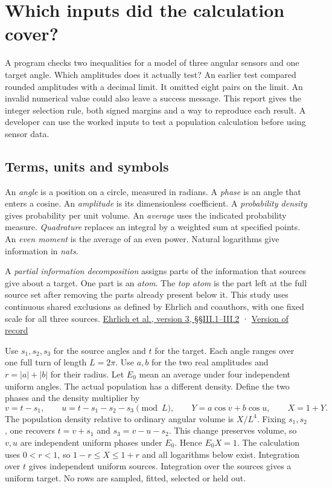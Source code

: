 \section{Which inputs did the calculation cover?}\label{which-inputs-did-the-calculation-cover}

A program checks two inequalities for a model of three angular sensors and one target angle. Which amplitudes does it actually test? An earlier test compared rounded amplitudes with a decimal limit. It omitted eight pairs on the limit. An invalid numerical value could also leave a success message. This report gives the integer selection rule, both signed margins and a way to reproduce each result. A developer can use the worked inputs to test a population calculation before using sensor data.

\subsection{Terms, units and symbols}\label{terms-units-and-symbols}

An \emph{angle} is a position on a circle, measured in radians. A \emph{phase} is an angle that enters a cosine. An \emph{amplitude} is its dimensionless coefficient. A \emph{probability density} gives probability per unit volume. An \emph{average} uses the indicated probability measure. \emph{Quadrature} replaces an integral by a weighted sum at specified points. An \emph{even moment} is the average of an even power. Natural logarithms give information in \emph{nats}.

A \emph{partial information decomposition} assigns parts of the information that sources give about a target. One part is an \emph{atom}. The \emph{top atom} is the part left at the full source set after removing the parts already present below it. This study uses continuous shared exclusions as defined by Ehrlich and coauthors, with one fixed scale for all three sources. \href{https://arxiv.org/html/2311.06373v3\#S3.SS2}{Ehrlich et al., version 3, §§III.1--III.2} · \href{https://doi.org/10.1103/PhysRevE.110.014115}{Version of record}

Use \(s_1,s_2,s_3\) for the source angles and \(t\) for the target. Each angle ranges over one full turn of length \(L=2\pi\). Use \(a,b\) for the two real amplitudes and \(r=|a|+|b|\) for their radius. Let \(E_0\) mean an average under four independent uniform angles. The actual population has a different density. Define the two phases and the density multiplier by \[
v=t-s_1,\qquad u=t-s_1-s_2-s_3\pmod L,\qquad Y=a\cos v+b\cos u,\qquad X=1+Y.
\] The population density relative to ordinary angular volume is \(X/L^4\). Fixing \(s_1,s_2\), one recovers \(t=v+s_1\) and \(s_3=v-u-s_2\). This change preserves volume, so \(v,u\) are independent uniform phases under \(E_0\). Hence \(E_0X=1\). The calculation uses \(0<r<1\), so \(1-r\le X\le1+r\) and all logarithms below exist. Integration over \(t\) gives independent uniform sources. Integration over the sources gives a uniform target. No rows are sampled, fitted, selected or held out.

